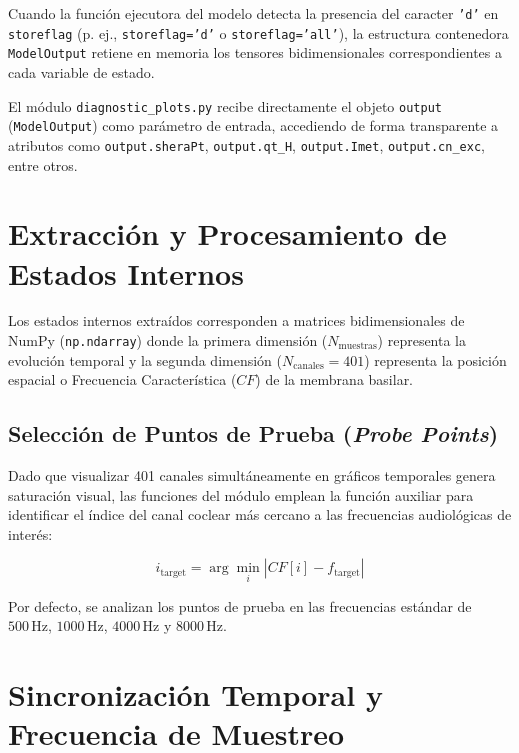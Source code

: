 \documentclass[12pt,a4paper]{article}
\begin{document}
Cuando la función ejecutora del modelo detecta la presencia del caracter \texttt{'d'} en \texttt{storeflag} (p. ej., \texttt{storeflag='d'} o \texttt{storeflag='all'}), la estructura contenedora \texttt{ModelOutput} retiene en memoria los tensores bidimensionales correspondientes a cada variable de estado. 

El módulo \texttt{diagnostic\_plots.py} recibe directamente el objeto \texttt{output} (\texttt{ModelOutput}) como parámetro de entrada, accediendo de forma transparente a atributos como \texttt{output.sheraPt}, \texttt{output.qt\_H}, \texttt{output.Imet}, \texttt{output.cn\_exc}, entre otros.

\section{Extracción y Procesamiento de Estados Internos}

Los estados internos extraídos corresponden a matrices bidimensionales de NumPy (\texttt{np.ndarray}) donde la primera dimensión ($N_{\text{muestras}}$) representa la evolución temporal y la segunda dimensión ($N_{\text{canales}} = 401$) representa la posición espacial o Frecuencia Característica ($CF$) de la membrana basilar.

\subsection{Selección de Puntos de Prueba (\emph{Probe Points})}
Dado que visualizar 401 canales simultáneamente en gráficos temporales genera saturación visual, las funciones del módulo emplean la función auxiliar  para identificar el índice del canal coclear más cercano a las frecuencias audiológicas de interés:

\begin{equation}
i_{\text{target}} = \arg\min_{i} \left| CF[i] - f_{\text{target}} \right|
\end{equation}

Por defecto, se analizan los puntos de prueba en las frecuencias estándar de $500\,\text{Hz}$, $1000\,\text{Hz}$, $4000\,\text{Hz}$ y $8000\,\text{Hz}$.

\section{Sincronización Temporal y Frecuencia de Muestreo}
\end{document}

